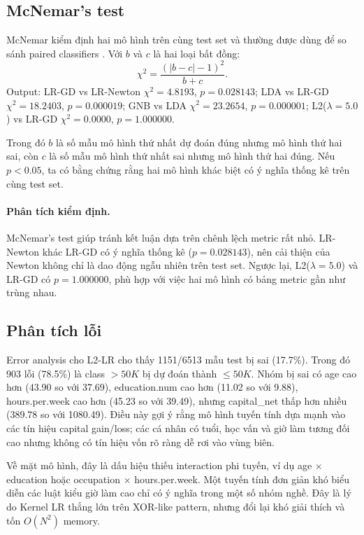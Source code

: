 \documentclass[12pt,a4paper]{article}
\begin{document}
\subsection{McNemar's test}

McNemar kiểm định hai mô hình trên cùng test set và thường được dùng để so sánh paired classifiers \cite{dietterich1998}. Với $b$ và $c$ là hai loại bất đồng:
\begin{equation}
 \chi^2=\frac{(|b-c|-1)^2}{b+c}.
\end{equation}
Output: LR-GD vs LR-Newton $\chi^2=4.8193$, $p=0.028143$; LDA vs LR-GD $\chi^2=18.2403$, $p=0.000019$; GNB vs LDA $\chi^2=23.2654$, $p=0.000001$; L2($\lambda=5.0$) vs LR-GD $\chi^2=0.0000$, $p=1.000000$.

Trong đó $b$ là số mẫu mô hình thứ nhất dự đoán đúng nhưng mô hình thứ hai sai, còn $c$ là số mẫu mô hình thứ nhất sai nhưng mô hình thứ hai đúng. Nếu $p<0.05$, ta có bằng chứng rằng hai mô hình khác biệt có ý nghĩa thống kê trên cùng test set.

\paragraph{Phân tích kiểm định.}
McNemar's test giúp tránh kết luận dựa trên chênh lệch metric rất nhỏ. LR-Newton khác LR-GD có ý nghĩa thống kê ($p=0.028143$), nên cải thiện của Newton không chỉ là dao động ngẫu nhiên trên test set. Ngược lại, L2($\lambda=5.0$) và LR-GD có $p=1.000000$, phù hợp với việc hai mô hình có bảng metric gần như trùng nhau.

\subsection{Phân tích lỗi}

Error analysis cho L2-LR cho thấy 1151/6513 mẫu test bị sai (17.7\%). Trong đó 903 lỗi (78.5\%) là class $>50K$ bị dự đoán thành $ \leq 50K$. Nhóm bị sai có age cao hơn (43.90 so với 37.69), education.num cao hơn (11.02 so với 9.88), hours.per.week cao hơn (45.23 so với 39.49), nhưng capital\_net thấp hơn nhiều (389.78 so với 1080.49). Điều này gợi ý rằng mô hình tuyến tính dựa mạnh vào các tín hiệu capital gain/loss; các cá nhân có tuổi, học vấn và giờ làm tương đối cao nhưng không có tín hiệu vốn rõ ràng dễ rơi vào vùng biên.

Về mặt mô hình, đây là dấu hiệu thiếu interaction phi tuyến, ví dụ age $\times$ education hoặc occupation $\times$ hours.per.week. Một tuyến tính đơn giản khó biểu diễn các luật kiểu giờ làm cao chỉ có ý nghĩa trong một số nhóm nghề. Đây là lý do Kernel LR thắng lớn trên XOR-like pattern, nhưng đổi lại khó giải thích và tốn $O(N^2)$ memory.
\end{document}
